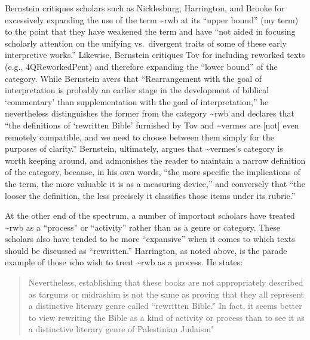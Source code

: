 Bernstein critiques scholars such as
Nicklesburg,\autocite{nickelsburg_stone1984}
Harrington,\autocite{harrington_kraft-nickelsburg1986} and
Brooke\autocite{brooke_schiffman-vanderkam2000} for excessively
expanding the use of the term \textasciitilde{}rwb at its ``upper
bound'' (my term) to the point that they have weakened the term and have
``not aided in focusing scholarly attention on the unifying
vs.~divergent traits of some of these early interpretive
works.''\autocite[179]{bernstein_textus2005} Likewise, Bernstein
critiques Tov for including reworked texts (e.g., 4QReworkedPent) and
therefore expanding the ``lower bound'' of the category. While Bernstein
avers that ``Rearrangement with the goal of interpretation is probably
an earlier stage in the development of biblical `commentary' than
supplementation with the goal of
interpretation,''\autocite[PAGE]{bernstein_textus2005} he nevertheless
distinguishes the former from the category \textasciitilde{}rwb and
declares that ``the definitions of `rewritten Bible' furnished by Tov
and \textasciitilde{}vermes are {[}not{]} even remotely compatible, and
we need to choose between them simply for the purposes of
clarity.''\autocite[185]{bernstein_textus2005} Bernstein, ultimately,
argues that \textasciitilde{}vermes's category is worth keeping around,
and admonishes the reader to maintain a narrow definition of the
category, because, in his own words, ``the more specific the
implications of the term, the more valuable it is as a measuring
device,''\autocite[195]{bernstein_textus2005} and conversely that ``the
looser the definition, the less precisely it classifies those items
under its rubric.'' \autocite[195]{bernstein_textus2005}

At the other end of the spectrum, a number of important scholars have
treated \textasciitilde{}rwb as a ``process'' or ``activity'' rather
than as a genre or category. These scholars also have tended to be more
``expansive'' when it comes to which texts should be discussed as
``rewritten.'' Harrington, as noted above, is the parade example of
those who wish to treat \textasciitilde{}rwb as a process. He states:

\begin{quote}
Nevertheless, establishing that these books are not appropriately
described as targums or midrashim is not the same as proving that they
all represent a distinctive literary genre called ``rewritten Bible.''
In fact, it seems better to view rewriting the Bible as a kind of
activity or process than to see it as a distinctive literary genre of
Palestinian
Judaism"\autocite[242--243]{harrington_kraft-nickelsburg1986}
\end{quote}

